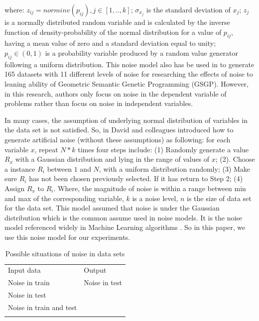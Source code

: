 where: $z_{ij} =norminv(p_{ij}),j\in [1,..,k]$; $\sigma_{x_{j}}$ is the standard deviation of $x_{j}$; $z_{j}$ is a  normally distributed random variable and  is calculated by the inverse function of density-probability of the normal distribution for a value of $p_{ij}$, having a mean value of zero and a standard deviation equal to unity; $p_{ij} \in (0, 1)$ is a probability variable produced by a random value generator following a uniform distribution. This noise model also has be used in \cite{miranda2017noisy} to generate 165 datasets with 11 different levels of noise for researching the effects of noise to leaning ability of Geometric Semantic Genetic Programming (GSGP). However, in this research, authors only focus on noise in the dependent variable of problems rather than focus on noise in independent variables.

In many cases, the assumption of underlying normal distribution of variables in the data set is not satisfied. So, in \cite{2010Dav} David and colleagues introduced how to generate artificial noise (without these assumptions) as following: for each variable $x$, repeat $N*k$ times four steps include: (1) Randomly generate a value $R_{x}$ with a Gaussian distribution and lying in the range of values of $x$; (2). Choose a instance $R_{i}$ between $1$ and $N$, with a uniform distribution randomly; (3) Make sure $R_{i}$ has not been chosen previously selected. If it has return to Step 2; (4) Assign $R_{x}$ to $R_{i}$. Where, the magnitude of noise is within a range between min and max of the corresponding variable, $k$ is a noise level, $n$ is the size of data set for the data set. This model assumed that noise is under the Gaussian distribution which is the common assume used in noise models. It is the noise model referenced widely in Machine Learning algorithms \cite{2010Dav}. So in this paper, we use this noise model for our experiments.
\par
\begin{table}
\caption{Possible situations of noise in data sets}
\label{tab:CaseOfNoise}       %
\begin{tabular}{ll}
\hline\noalign{\smallskip}
Input data & Output \\
\noalign{\smallskip}\hline\noalign{\smallskip}
Noise in train & Noise in test \\
Noise in test & \\
Noise in train and test & \\
\noalign{\smallskip}\hline
\end{tabular}
\end{table}
